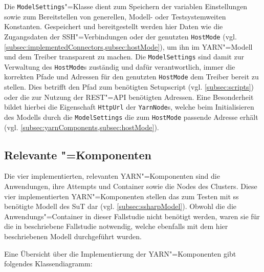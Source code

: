 Die \texttt{ModelSettings}"=Klasse dient zum Speichern der variablen Einstellungen sowie zum Bereitstellen von generellen, Modell- oder Testsystemweiten Konstanten.
Gespeichert und bereitgestellt werden hier Daten wie \zB die Zugangsdaten der SSH"=Verbindungen oder der genutzten \texttt{HostMode} (vgl.  \cref{subsec:implementedConnectors,subsec:hostMode}), um ihn im \gls{YARN}"=Modell und dem Treiber transparent zu machen.
Die \texttt{ModelSettings} sind damit zur Verwaltung des \texttt{HostMode}s zuständig und dafür verantwortlich, immer die korrekten Pfade und Adressen für den genutzten \texttt{HostMode} dem Treiber bereit zu stellen.
Dies betrifft \zB den Pfad zum benötigten Setupscript (vgl. \cref{subsec:scripts}) oder die zur Nutzung der \gls{REST}"=API benötigten Adressen.
Eine Besonderheit bildet hierbei die Eigenschaft \texttt{HttpUrl} der \texttt{YarnNode}s, welche beim Initialisieren des Modells durch die \texttt{ModelSettings} die zum \texttt{HostMode} passende Adresse erhält (vgl. \cref{subsec:yarnComponents,subsec:hostMode}).

\subsection{Relevante "=Komponenten}
\label{subsec:yarnComponents}

Die vier implementierten, relevanten \gls{YARN}"=Komponenten sind die Anwendungen, ihre \glspl{Attempt} und \gls{Container} sowie die Nodes des Clusters.
Diese vier implementierten \gls{YARN}"=Komponenten stellen das zum Testen mit \gls{ss} benötigte Modell des \gls{SuT} dar (vgl. \cref{subsec:ssharpModel}).
Obwohl die die Anwendungs"=Container in dieser Fallstudie nicht benötigt werden, waren sie für die in \cite{Eberhardinger2018} beschriebene Fallstudie notwendig, welche ebenfalls mit dem hier beschriebenen Modell durchgeführt wurden.

Eine Übersicht über die Implementierung der \gls{YARN}"=Komponenten gibt folgendes Klassendiagramm:

